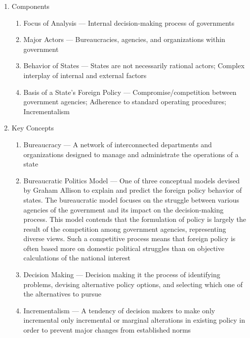 \documentclass[12pt]{article}
\begin{document}
\begin{enumerate}
      \item Components

        \begin{enumerate}

          \item Focus of Analysis — Internal decision-making process of governments

          \item Major Actors — Bureaucracies, agencies, and organizations within government

          \item Behavior of States — States are not necessarily rational actors; Complex interplay of internal and external factors

          \item Basis of a State's Foreign Policy — Compromise/competition between government agencies; Adherence to standard operating procedures; Incrementalism

        \end{enumerate}

      \item Key Concepts

        \begin{enumerate}

          \item Bureaucracy — A network of interconnected departments and organizations designed to manage and administrate the operations of a state

          \item Bureaucratic Politics Model — One of three conceptual models devised by Graham Allison to explain and predict the foreign policy behavior of states. The bureaucratic model focuses on the struggle between various agencies of the government and its impact on the decision-making process. This model contends that the formulation of policy is largely the result of the competition among government agencies, representing diverse views. Such a competitive process means that foreign policy is often based more on domestic political struggles than on objective calculations of the national interest
            
          \item Decision Making — Decision making it the process of identifying problems, devising alternative policy options, and selecting which one of the alternatives to pursue

          \item Incrementalism — A tendency of decision makers to make only incremental only incremental or marginal alterations in existing policy in order to prevent major changes from established norms


\end{enumerate}
\end{enumerate}
\end{document}
